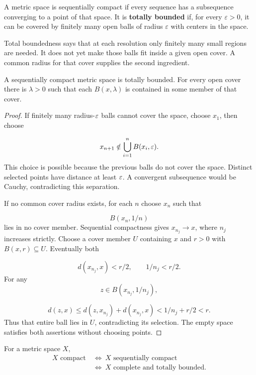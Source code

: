 \begin{definition}
\label{def:total-boundedness}
A metric space is sequentially compact if every sequence has a subsequence
converging to a point of that space. It is \textbf{totally bounded} if,
for every $\varepsilon>0$, it can be covered by finitely many open balls
of radius $\varepsilon$ with centers in the space.
\end{definition}
Total boundedness says that at each resolution only finitely many small
regions are needed. It does not yet make those balls fit inside a given
open cover. A common radius for that cover supplies the second ingredient.

\begin{lemma}\label{lem:sequential-cover-mechanisms}
A sequentially compact metric space is totally bounded. For every open cover there is $\lambda>0$ such that each
$B(x,\lambda)$ is contained in some member of that cover.
\end{lemma}
\begin{proof}
If finitely many radius-$\varepsilon$ balls cannot cover the space, choose $x_1$, then choose

\[
x_{n+1}\notin\bigcup_{i=1}^nB(x_i,\varepsilon).
\]
 This choice is possible
because the previous balls do not cover the space. Distinct selected
points have distance at least $\varepsilon$. A convergent subsequence would be
Cauchy, contradicting this separation.

If no common cover radius exists, for each $n$ choose $x_n$ such that

\[
B(x_n,1/n)
\]
 lies in no cover member. Sequential compactness gives
$x_{n_j}\to x$, where $n_j$ increases strictly. Choose a cover member
$U$ containing $x$ and $r>0$ with $B(x,r)\subseteq U$. Eventually both

\[
d(x_{n_j},x)<r/2,\qquad 1/n_j<r/2.
\]
 For any
\[
z\in B(x_{n_j},1/n_j),
\]

\[
d(z,x)\leq d(z,x_{n_j})+d(x_{n_j},x)<1/n_j+r/2<r.
\]
Thus that entire ball lies in $U$, contradicting its selection.
The empty space satisfies both assertions without choosing points.
\end{proof}
\begin{theorem}\label{thm:metric-compact-sequential}
For a metric space $X$,
\[
\boxed{\begin{aligned}
X\text{ compact}&\ \Longleftrightarrow\ X\text{ sequentially compact}\\
&\ \Longleftrightarrow\ X\text{ complete and totally bounded}.
\end{aligned}}
\]
\end{theorem}
